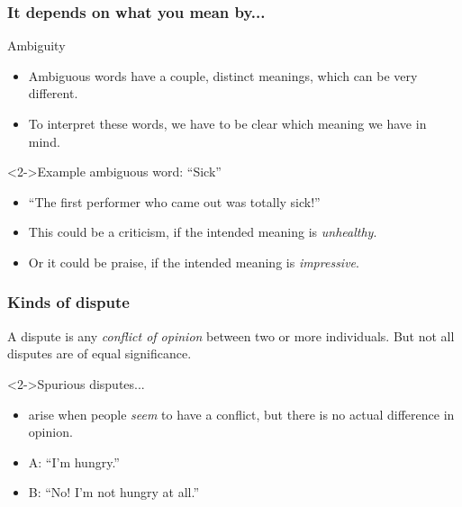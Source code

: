 \documentclass[10pt,letterpaper,xcolor=dvipsnames,handout]{beamer}
\begin{document}
\begin{frame}
\frametitle{It depends on what you mean by...}

\begin{block}{Ambiguity}
  \begin{itemize}
    \item Ambiguous words have a couple, distinct meanings, which can be very different.
    \item To interpret these words, we have to be clear which meaning we have in mind.
  \end{itemize}
\end{block}

\begin{block}<2->{Example ambiguous word: ``Sick''}
  \begin{itemize}
    \item ``The first performer who came out was totally sick!''
    \item This could be a criticism, if the intended meaning is \textit{unhealthy}.
    \item Or it could be praise, if the intended meaning is \textit{impressive}.
  \end{itemize}
\end{block}

\end{frame}

\begin{frame}
\frametitle{Kinds of dispute}

A dispute is any \textit{conflict of opinion} between two or more individuals.  But not all disputes are of equal significance.

\begin{block}<2->{Spurious disputes...}
\begin{itemize}
  \item arise when people \textit{seem} to have a conflict, but there is no actual difference in opinion.
  \item A: ``I'm hungry.''
  \item B: ``No!  I'm not hungry at all.''
\end{itemize}
\end{block}

\end{frame}
\end{document}
